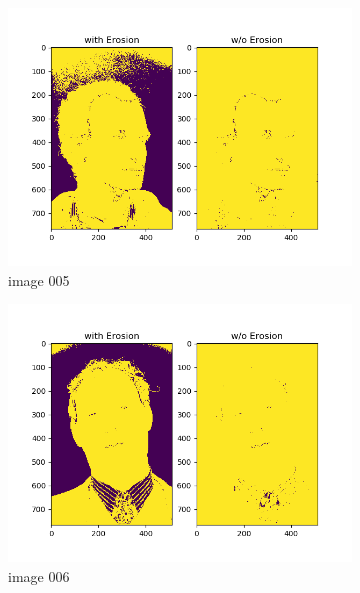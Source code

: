 \documentclass[11pt]{report}
\begin{document}
\begin{figure}[H]
\begin{subfigure}{0.3\textwidth}
        \includegraphics[width=\textwidth]{Task 2 Plots/skin_color_mask_erode_005.png}
        \caption{image 005}
        \label{fig:skin_colormask_erode5}
    \end{subfigure}
    \begin{subfigure}{0.3\textwidth}
        \centering
        \includegraphics[width=\textwidth]{Task 2 Plots/skin_color_mask_erode_006.png}
        \caption{image 006}
        \label{fig:skin_colormask_erode6}
    \end{subfigure}
    \begin{subfigure}{0.3\textwidth}
        \centering

\end{subfigure}
\end{figure}
\end{document}
